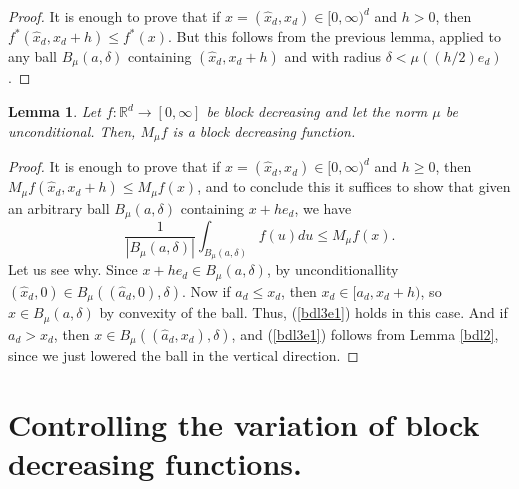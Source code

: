 \documentclass[12pt]{amsart}
\numberwithin{equation}{section}
\theoremstyle{plain}
\newtheorem{lemma}[theorem]{Lemma}
\theoremstyle{definition}
\theoremstyle{remark}
\begin{document}
\begin{proof}  It is enough to prove that if $x=(\hat{x}_d,x_d)\in [0, \infty)^d$ and   $h > 0$, then
  $f^*(\hat{x}_{d},x_d+h)\le f^* (x)$. But this
follows from the previous lemma, applied to any ball $B_\mu (a, \delta)$
containing $(\hat{x}_{d},x_d+h)$ and with radius $\delta < \mu ((h/2) e_d)$.
\end{proof}

\begin{lemma}\label{lemma3}
  Let $f:\mathbb{R}^d\rightarrow [0,\infty]$ be  block decreasing
and let the norm $\mu$ be  unconditional. Then,
   $M_\mu f$ is a block
  decreasing function.
\end{lemma}
\begin{proof}
  It is enough to prove that if $x=(\hat{x}_d,x_d)\in [0, \infty)^d$ and   $h\ge0$, then
  $M_\mu f(\hat{x}_d,x_d+h) \le M_\mu f(x)$, and to conclude this it
  suffices to show that given an arbitrary ball $B_\mu(a,\delta)$
  containing $x+he_d$, we have
  \begin{equation}\label{bdl3e1}
    \frac{1}{|B_\mu(a,\delta)|}\int_{B_\mu(a,\delta)}f(u)du
    \le M_\mu f(x).
  \end{equation}
Let us see why.  Since $x+he_d\in B_\mu(a,\delta)$,
by unconditionallity
$(\hat{x}_d, 0)\in B_\mu((\hat{a}_d, 0),\delta)$.
Now if $a_d \le x_d$, then $x_d\in [a_d, x_d+h)$, so
$x\in B_\mu(a,\delta)$ by convexity of the ball. Thus,  (\ref{bdl3e1}) holds in this case. And if $a_d > x_d$, then
$x\in B_\mu((\hat{a}_d,x_d),\delta)$, and
(\ref{bdl3e1}) follows from Lemma \ref{bdl2}, since we just lowered the
ball in the vertical direction.
\end{proof}

\section{Controlling the variation of block decreasing functions.}
\end{document}
